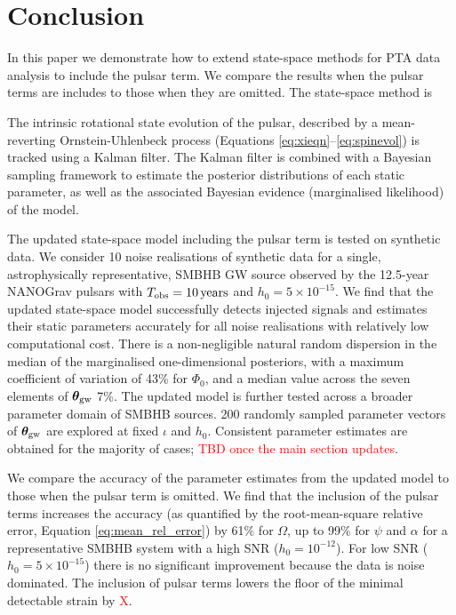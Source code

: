 \documentclass[fleqn,usenatbib,useAMS]{mnras}
\begin{document}
\section{Conclusion}\label{sec:discussion}
In this paper we demonstrate how to extend state-space methods for PTA data analysis to include the pulsar term. We compare the results when the pulsar terms are includes to those when they are omitted. The state-space method is  \newline 


The intrinsic rotational state evolution of the pulsar, described by a mean-reverting Ornstein-Uhlenbeck process (Equations \eqref{eq:xieqn}--\eqref{eq:spinevol}) is tracked using a Kalman filter. The Kalman filter is combined with a Bayesian sampling framework to estimate the posterior distributions of each static parameter, as well as the associated Bayesian evidence (marginalised likelihood) of the model. \newline 

The updated state-space model including the pulsar term is tested on synthetic data. We consider 10 noise realisations of synthetic data for a single, astrophysically representative, SMBHB GW source observed by the 12.5-year NANOGrav pulsars with $T_{\rm obs} = 10 \, {\rm years}$ and $h_0 = 5 \times 10^{-15}$. We find that the updated state-space model successfully detects injected signals and estimates their static parameters accurately for all noise realisations with relatively low computational cost. There is a non-negligible natural random dispersion in the median of the marginalised one-dimensional posteriors, with a maximum coefficient of variation of 43\% for $\Phi_0$, and a median value across the seven elements of $\boldsymbol{\theta}_{\rm gw}$ 7\%. The updated model is further tested across a broader parameter domain of SMBHB sources. 200 randomly sampled parameter vectors of $\boldsymbol{\theta}_{\rm gw}$ are explored at fixed $\iota$ and $h_0$. Consistent parameter estimates are obtained for the majority of cases; \textcolor{red}{TBD once the main section updates}. \newline 


We compare the accuracy of the parameter estimates from the updated model to those when the pulsar term is omitted. We find that the inclusion of the pulsar terms increases the accuracy (as quantified by the root-mean-square relative error, Equation \eqref{eq:mean_rel_error}) by 61\% for $\Omega$, up to 99\% for $\psi$ and $\alpha$ for a representative SMBHB system with a high SNR ($h_0 = 10^{-12}$). For low SNR ($h_0 = 5 \times 10^{-15}$) there is no significant improvement because the data is noise dominated. The inclusion of pulsar terms lowers the floor of the minimal detectable strain by \textcolor{red}{X}. \newline  
\end{document}
